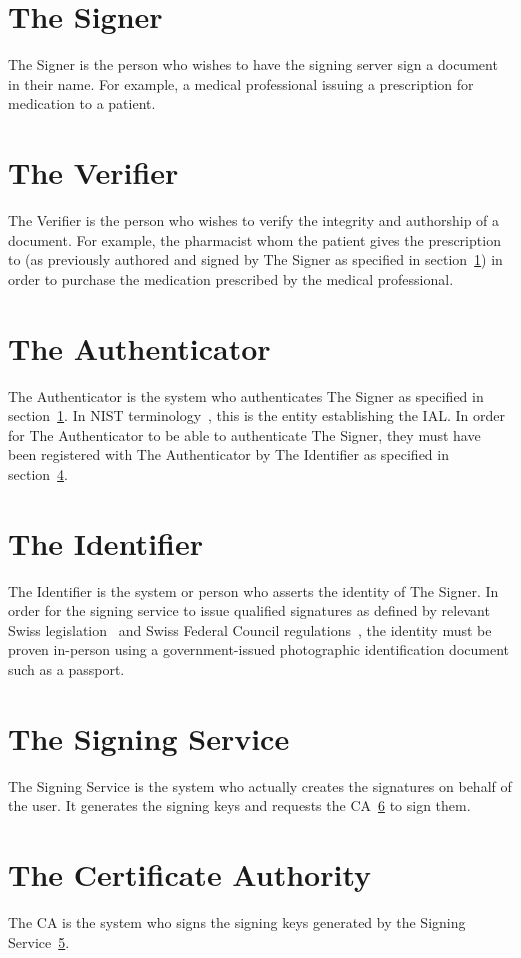 \section{The Signer}
\label{sec:actorsigner}
The Signer is the person who wishes to have the signing server sign a document in their name.
For example, a medical professional issuing a prescription for medication to a patient.

\section{The Verifier}
\label{sec:actorverifier}
The Verifier is the person who wishes to verify the integrity and authorship of a document.
For example, the pharmacist whom the patient gives the prescription to (as previously authored and signed by The Signer as specified in section~\ref{sec:actorsigner}) in order to purchase the medication prescribed by the medical professional.

\section{The Authenticator}
\label{sec:actorauthenticator}
The Authenticator is the system who authenticates The Signer as specified in section~\ref{sec:actorsigner}.
In \gls{NIST} terminology~\cite{nistdigitalidentityguidelines}, this is the entity establishing the \gls{IAL}.
In order for The Authenticator to be able to authenticate The Signer,
they must have been registered with The Authenticator by The Identifier as specified in section~\ref{sec:authoridentifier}.

\section{The Identifier}
\label{sec:authoridentifier}
The Identifier is the system or person who asserts the identity of The Signer.
In order for the signing service to issue qualified signatures as defined by relevant Swiss legislation~\cite{zertes} and Swiss Federal Council regulations~\cite{vzertes},
the identity must be proven in-person using a government-issued photographic identification document such as a passport.

\section{The Signing Service}
\label{sec:actorsigningservice}
The Signing Service is the system who actually creates the signatures on behalf of the user.
It generates the signing keys and requests the \gls{CA}~\ref{sec:actorca} to sign them.

\section{The Certificate Authority}
\label{sec:actorca}
The \gls{CA} is the system who signs the signing keys generated by the Signing Service~\ref{sec:actorsigningservice}.

